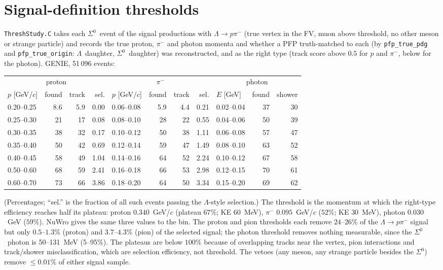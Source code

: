 \documentclass[11pt,a4paper]{article}
\newcommand{\Szero}{\ensuremath{\Sigma^{0}}}
\newcommand{\Lam}{\ensuremath{\Lambda}}
\begin{document}
\section{Signal-definition thresholds}
\label{app:thresh}
\texttt{ThreshStudy.C} takes each \Szero\ event of the signal productions with $\Lam\to p\pi^-$
(true vertex in the FV, muon above threshold, no other meson or strange particle) and records the
true proton, $\pi^-$ and photon momenta and whether a PFP truth-matched to each (by
\texttt{pfp\_true\_pdg} and \texttt{pfp\_true\_origin}: \Lam\ daughter, \Szero\ daughter) was
reconstructed, and as the right type (track score above $0.5$ for $p$ and $\pi^-$, below for the
photon). GENIE, 51\,096 events:
\begin{center}
\small
\begin{tabular}{lrrr@{\qquad}lrrr@{\qquad}lrr}
\toprule
\multicolumn{4}{c}{proton} & \multicolumn{4}{c}{$\pi^-$} & \multicolumn{3}{c}{photon} \\
$p$ [GeV/$c$] & found & track & sel. & $p$ [GeV/$c$] & found & track & sel. & $E$ [GeV] & found & shower \\
\midrule
0.20--0.25 & 8.6 & 5.9 & 0.00 & 0.06--0.08 & 5.9 & 4.4 & 0.21 & 0.02--0.04 & 37 & 30 \\
0.25--0.30 & 21 & 17 & 0.08 & 0.08--0.10 & 28 & 22 & 0.55 & 0.04--0.06 & 50 & 39 \\
0.30--0.35 & 38 & 32 & 0.17 & 0.10--0.12 & 50 & 38 & 1.11 & 0.06--0.08 & 57 & 47 \\
0.35--0.40 & 50 & 42 & 0.69 & 0.12--0.14 & 59 & 47 & 1.49 & 0.08--0.10 & 63 & 52 \\
0.40--0.45 & 58 & 49 & 1.04 & 0.14--0.16 & 64 & 52 & 2.24 & 0.10--0.12 & 67 & 58 \\
0.50--0.60 & 68 & 59 & 2.41 & 0.16--0.18 & 66 & 53 & 2.98 & 0.12--0.15 & 70 & 61 \\
0.60--0.70 & 73 & 66 & 3.86 & 0.18--0.20 & 64 & 50 & 3.34 & 0.15--0.20 & 69 & 62 \\
\bottomrule
\end{tabular}
\end{center}
(Percentages; ``sel.'' is the fraction of all such events passing the \Lam-style selection.)
The threshold is the momentum at which the right-type efficiency reaches half its plateau:
proton $0.340$~GeV/$c$ (plateau $67\%$; KE $60$~MeV), $\pi^-$ $0.095$~GeV/$c$ ($52\%$; KE
$30$~MeV), photon $0.030$~GeV ($59\%$). NuWro gives the same three values to the bin. The proton
and pion thresholds each remove $24$--$26\%$ of the $\Lam\to p\pi^-$ signal but only $0.5$--$1.3\%$
(proton) and $3.7$--$4.3\%$ (pion) of the selected signal; the photon threshold removes nothing
measurable, since the \Szero\ photon is 50--131~MeV (5--95\%). The plateaus are below $100\%$
because of overlapping tracks near the vertex, pion interactions and track/shower
misclassification, which are selection efficiency, not threshold. The vetoes (any meson, any
strange particle besides the \Szero) remove $\leq0.01\%$ of either signal sample.
\end{document}
